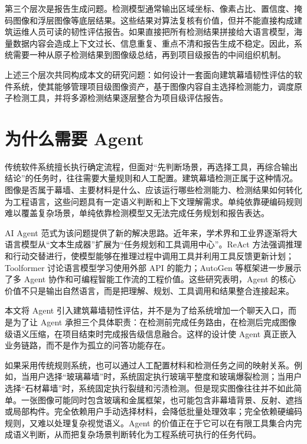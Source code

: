 第三个层次是报告生成问题。检测模型通常输出区域坐标、像素占比、置信度、掩码图像和浮层图像等底层结果。这些结果对算法复核有价值，但并不能直接构成建筑运维人员可读的韧性评估报告。如果直接把所有检测结果拼接给大语言模型，海量数据内容会造成上下文过长、信息重复、重点不清和报告生成不稳定。因此，系统需要一种从原子检测结果到图像级总结，再到项目级报告的中间组织机制。

上述三个层次共同构成本文的研究问题：如何设计一套面向建筑幕墙韧性评估的软件系统，使其能够管理项目级图像资产，基于图像内容自主选择检测能力，调度原子检测工具，并将多源检测结果逐层整合为项目级评估报告。

\section{为什么需要 Agent}
\label{sec:intro-why-agent}

传统软件系统擅长执行确定流程，但面对“先判断场景，再选择工具，再综合输出结论”的任务时，往往需要大量规则和人工配置。建筑幕墙检测正属于这种情况。图像是否属于幕墙、主要材料是什么、应该运行哪些检测能力、检测结果如何转化为工程语言，这些问题具有一定语义判断和上下文理解需求。单纯依靠硬编码规则难以覆盖复杂场景，单纯依靠检测模型又无法完成任务规划和报告表达。

AI Agent 范式为该问题提供了新的解决思路。近年来，学术界和工业界逐渐将大语言模型从“文本生成器”扩展为“任务规划和工具调用中心”。ReAct 方法强调推理和行动交替进行，使模型能够在推理过程中调用工具并利用工具反馈更新计划\cite{yao2023react}；Toolformer 讨论语言模型学习使用外部 API 的能力\cite{schick2023toolformer}；AutoGen 等框架进一步展示了多 Agent 协作和可编程智能工作流的工程价值\cite{wu2023autogen}。这些研究表明，Agent 的核心价值不只是输出自然语言，而是把理解、规划、工具调用和结果整合连接起来。

本文将 Agent 引入建筑幕墙韧性评估，并不是为了给系统增加一个聊天入口，而是为了让 Agent 承担三个具体职责：在检测前完成任务路由，在检测后完成图像级语义压缩，在项目结束时完成报告级信息融合。这样的设计使 Agent 真正嵌入业务链路，而不是作为孤立的问答功能存在。

如果采用传统规则系统，也可以通过人工配置材料和检测任务之间的映射关系。例如，当用户选择“玻璃幕墙”时，系统固定执行玻璃平整度和玻璃爆裂检测；当用户选择“石材幕墙”时，系统固定执行裂缝和污渍检测。但是现实图像往往并不如此简单。一张图像可能同时包含玻璃和金属框架，也可能包含非幕墙背景、反射、遮挡或局部构件。完全依赖用户手动选择材料，会降低批量处理效率；完全依赖硬编码规则，又难以处理复杂视觉语义。Agent 的价值正在于它可以在有限工具集合内完成语义判断，从而把复杂场景判断转化为工程系统可执行的任务代码。

